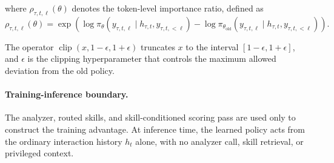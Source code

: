 \documentclass{llmxive}
\begin{document}
where \(\rho_{\tau,t,\ell}(\theta)\) denotes the token-level importance ratio, defined as
\begin{equation*}
    \rho_{\tau,t,\ell}(\theta)
    =
    \exp\left(
        \log\pi_{\theta}
        (y_{\tau,t,\ell}\mid h_{\tau,t},y_{\tau,t,<\ell})
        -
        \log\pi_{\theta_{\mathrm{old}}}
        (y_{\tau,t,\ell}\mid h_{\tau,t},y_{\tau,t,<\ell})
    \right).
\end{equation*}

The operator \(\operatorname{clip}(x,1-\epsilon,1+\epsilon)\) truncates \(x\) to the interval
\([1-\epsilon,1+\epsilon]\), and \(\epsilon\) is the clipping hyperparameter that controls the maximum allowed deviation from the old policy.

\paragraph{Training-inference boundary.}
The analyzer, routed skills, and skill-conditioned scoring pass are used only to construct the training advantage. At inference time, the learned policy acts from the ordinary interaction history $h_t$ alone, with no analyzer call, skill retrieval, or privileged context. 
\end{document}
